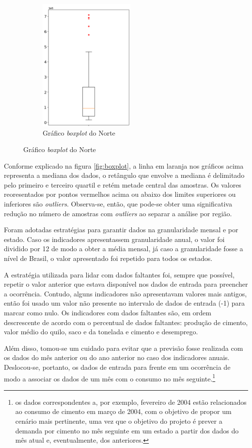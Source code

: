 \begin{figure}[H]
\begin{subfigure}{5cm}
    \end{subfigure}
    \hfill
    \begin{subfigure}{5cm}
        \centering
        \includegraphics[width=4.8cm]{../figuras/graficos/boxplot-pib-cc-n.png}
        \caption{Gráfico \textit{boxplot} do Norte}
    \end{subfigure}
\end{figure}

Conforme explicado na figura \ref{fig:boxplot}, a linha em 
laranja nos gráficos acima representa a mediana dos dados,
o retângulo que envolve a mediana é delimitado pelo primeiro e 
terceiro quartil e retém metade central das amostras. Os valores
reoresentados por pontos vermelhos acima ou abaixo dos limites
superiores ou inferiores são \textit{outliers}. Observa-se,
então, que pode-se obter uma significativa redução no número de 
amostras com \textit{outliers} ao separar a análise por região.\cite{boxplot}

Foram adotadas estratégias para garantir dados na granularidade
mensal e por estado. Caso os indicadores apresentassem granularidade anual, 
o valor foi dividido por 12 de modo a obter a média mensal, já caso a granularidade
fosse a nível de Brasil, o valor apresentado foi repetido para todos os 
estados.


A estratégia utilizada para lidar com dados faltantes foi, sempre que possível,
repetir o valor anterior que estava disponível nos dados de entrada para
preencher a ocorrência. Contudo, alguns indicadores não apresentavam 
valores mais antigos, então foi usado um valor não presente no intervalo
de dados de entrada (-1) para marcar como nulo. Os indicadores 
com dados faltantes são, em ordem descrescente de acordo com 
o percentual de dados faltantes: produção de cimento, valor 
médio do quilo, saco e da tonelada e cimento e desemprego.

Além disso, tomou-se um cuidado para evitar que a previsão fosse 
realizada com os dados do mês anterior ou do ano anterior no caso dos
indicadores anuais. Deslocou-se, portanto, os dados de entrada 
para frente em um ocorrência de modo a associar os dados de um 
mês com o consumo no mês seguinte.\footnote{os dados correspondentes 
a, por exemplo, fevereiro de 2004 estão relacionados ao consumo de 
cimento em março de 2004, com o objetivo de propor um cenário mais pertinente, 
uma vez que o objetivo do projeto é prever a demanda por cimento no mês seguinte 
em um estado a partir dos dados do mês atual e, eventualmente, dos anteriores.
}

